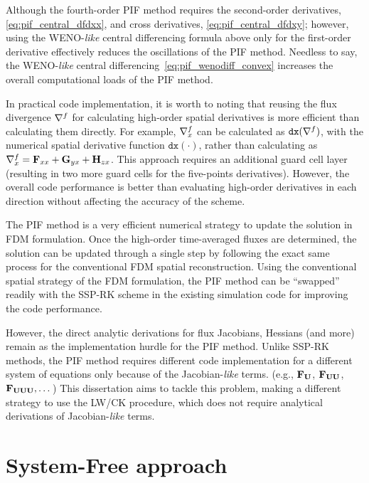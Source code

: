 Although the fourth-order PIF method requires the second-order derivatives, \cref{eq:pif_central_dfdxx},
and cross derivatives, \cref{eq:pif_central_dfdxy}; however, using the WENO-\textit{like}
central differencing formula above only for the first-order derivative
effectively reduces the oscillations of the PIF method.
Needless to say, the WENO-\textit{like} central differencing~\cref{eq:pif_wenodiff_convex}
increases the overall computational loads of the PIF method.

In practical code implementation, it is worth to noting that reusing the flux divergence \( \nabla^{f} \)
for calculating high-order spatial derivatives is more efficient than calculating them directly.
For example, \( \nabla^{f}_{x} \) can be calculated as \( \texttt{dx}(\nabla^{f}) \),
with the numerical spatial derivative function \( \texttt{dx}(\cdot) \),
rather than calculating as \( \nabla^{f}_{x} = \mathbf{F}_{xx} + \mathbf{G}_{yx}+ \mathbf{H}_{zx} \).
This approach requires an additional guard cell layer
(resulting in two more guard cells for the five-points derivatives).
However, the overall code performance is better than
evaluating high-order derivatives in each direction without affecting the accuracy of the scheme.

The PIF method is a very efficient numerical strategy to update the solution in FDM formulation.
Once the high-order time-averaged fluxes are determined, the solution can be updated
through a single step by following the exact same process for the conventional FDM spatial reconstruction.
Using the conventional spatial strategy of the FDM formulation,
the PIF method can be ``swapped'' readily with the SSP-RK scheme
in the existing simulation code for improving the code performance.

However, the direct analytic derivations for flux Jacobians, Hessians (and more)
remain as the implementation hurdle for the PIF method.
Unlike SSP-RK methods, the PIF method requires different code implementation
for a different system of equations only because of the Jacobian-\textit{like} terms.
(e.g., \( \mathbf{F}_{\mathbf{U}} \), \( \mathbf{F}_{\mathbf{U}\mathbf{U}} \), \( \mathbf{F}_{\mathbf{U}\mathbf{U}\mathbf{U}}, \dots \))
This dissertation aims to tackle this problem,
making a different strategy to use the LW/CK procedure,
which does not require analytical derivations of Jacobian-\textit{like} terms.



\section{System-Free approach}\label{sec:original_sf}

